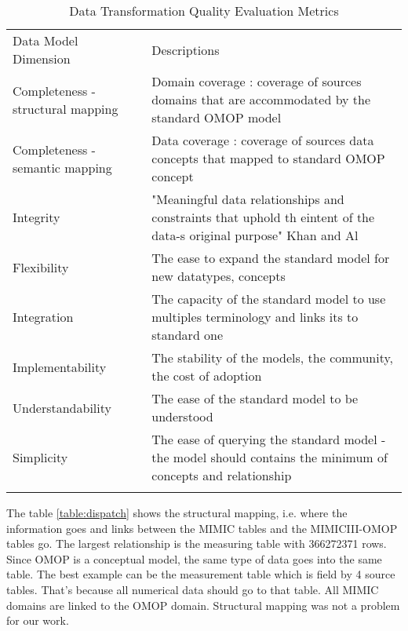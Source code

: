 \tiny
\begin{table*}[t]
\caption{Data Transformation Quality Evaluation Metrics}
\begin{tabular}{@{}ll@{}}\toprule
Data Model Dimension              & Descriptions                                                                                                      \\\colrule
Completeness - structural mapping & Domain coverage : coverage of sources domains that are accommodated by the standard OMOP model                    \\
Completeness - semantic mapping   & Data coverage : coverage of sources data concepts that mapped to standard OMOP concept                           \\
Integrity                         & "Meaningful data relationships and constraints that uphold th eintent of the data-s original purpose" Khan and Al \\
Flexibility                       & The ease to expand the standard model for new datatypes, concepts                                                 \\
Integration                       & The capacity of the standard model to use multiples terminology and links its to standard one                     \\
Implementability                  & The stability of the models, the community, the cost of adoption                                                  \\
Understandability                 & The ease of the standard model to be understood                                                           	      \\
Simplicity                        & The ease of querying the standard model - the model should contains the minimum of concepts and relationship    \\\botrule 
\end{tabular}
\label{table:quality}
\end{table*}
\normalsize


The table \ref{table:dispatch} shows the structural mapping, i.e. where the 
information goes and links between the MIMIC tables and the MIMICIII-OMOP tables go.
The largest relationship is the measuring table with 366272371 rows.
Since OMOP is a conceptual model, the same type of data goes into the same table. 
The best example can be the measurement table which is field by 4 source tables. 
That's because all numerical data should go to that table.
All MIMIC domains are linked to the OMOP domain. 
Structural mapping was not a problem for our work.

